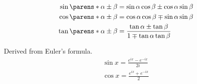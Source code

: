 \begin{multicols}{2}
\begin{CheatsheetEntryFrame}
        \begin{align*}
            \sin{\parens*{\alpha \pm \beta}} &= \sin{\alpha} \cos{\beta } \pm \cos{\alpha} \sin{\beta } \\
            \cos{\parens*{\alpha \pm \beta}} &= \cos{\alpha} \cos{\beta } \mp \sin{\alpha} \sin{\beta } \\
            \tan{\parens*{\alpha \pm \beta}} &= \frac{\tan{\alpha} \pm \tan{\beta}}{1 \mp \tan{\alpha} \tan{\beta}}
        \end{align*}

    \end{CheatsheetEntryFrame}

    \begin{CheatsheetEntryFrame}


        Derived from Euler's formula.
        \begin{align*}
            \sin{x} = \frac{e^{ix} - e^{-ix}}{2i} \\
            \cos{x} = \frac{e^{ix} + e^{-ix}}{2}
        \end{align*}

    \end{CheatsheetEntryFrame}



\end{multicols}
